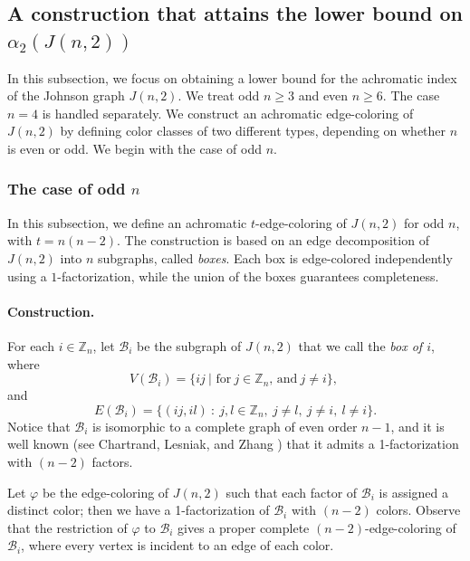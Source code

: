 \documentclass{article}
\newcommand{\Z}{\mathbb{Z}}
\begin{document}
\subsection{A construction that attains the lower bound on $\alpha_2(J(n,2))$}
\label{subsec:lowerbound}

In this subsection, we focus on obtaining a lower bound for the achromatic index of the Johnson graph $J(n,2)$.
We treat odd $n\geq3$ and even $n\geq6$. The case $n=4$ is handled separately.
We construct an %
achromatic edge-coloring of $ J(n,2) $ by defining color classes of two different types, depending on whether $n$ is even or odd. We begin with the case of odd $n$.


\subsubsection{The case of odd $n$}

In this subsection, we define an achromatic $t$-edge-coloring of $J(n,2)$ for odd $n$, with $t=n(n-2)$. The construction is based on an edge decomposition of $J(n,2)$ into $n$ subgraphs, called \emph{boxes}. Each box is edge-colored independently using a $1$-factorization,  while the union of the boxes guarantees completeness.
\paragraph{Construction.}

For each $i\in \mathbb{Z}_n$, let $\mathcal{B}_i$ be the subgraph of $J(n,2)$ that we call the {\emph{box of $i$}}, where
$$V(\mathcal{B}_i)=\{ij\ | \text{ for}\ j\in \Z_n\text{, and}\ j\not=i\},\ $$ and
$$
E(\mathcal{B}_i)=\{(ij,il)\ :\ j,l \in \mathbb{Z}_n,\ j\neq l,\ j\neq i,\ l\neq i\}.
$$
Notice that $\mathcal{B}_i$ is isomorphic to a complete graph of even order  $n-1$, and it is well known (see Chartrand, Lesniak, and Zhang \cite{CLZ16}) that it admits a 1-factorization with $(n-2)$ factors.

Let $\varphi$ be the edge-coloring of $J(n,2)$ such that each factor of $\mathcal{B}_i$ is assigned a distinct color; then we have a 1-factorization of $\mathcal{B}_i$ with $(n-2)$ colors. Observe that the restriction of $\varphi$ to $\mathcal{B}_i$ gives a proper complete $(n-2)$-edge-coloring of $\mathcal{B}_i$, where every vertex is incident to an edge of each color.
\end{document}

